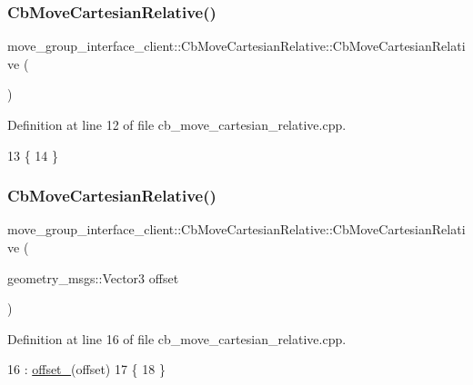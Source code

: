 \subsubsection{\texorpdfstring{Cb\+Move\+Cartesian\+Relative()}{CbMoveCartesianRelative()}\hspace{0.1cm}{\footnotesize\ttfamily [1/2]}}
{\footnotesize\ttfamily move\+\_\+group\+\_\+interface\+\_\+client\+::\+Cb\+Move\+Cartesian\+Relative\+::\+Cb\+Move\+Cartesian\+Relative (\begin{DoxyParamCaption}{ }\end{DoxyParamCaption})}



Definition at line 12 of file cb\+\_\+move\+\_\+cartesian\+\_\+relative.\+cpp.


\begin{DoxyCode}
13 \{
14 \}
\end{DoxyCode}
\mbox{\label{classmove__group__interface__client_1_1CbMoveCartesianRelative_afae824d1c68eaae5923166606ddb09f6}} 
\subsubsection{\texorpdfstring{Cb\+Move\+Cartesian\+Relative()}{CbMoveCartesianRelative()}\hspace{0.1cm}{\footnotesize\ttfamily [2/2]}}
{\footnotesize\ttfamily move\+\_\+group\+\_\+interface\+\_\+client\+::\+Cb\+Move\+Cartesian\+Relative\+::\+Cb\+Move\+Cartesian\+Relative (\begin{DoxyParamCaption}\item[{geometry\+\_\+msgs\+::\+Vector3}]{offset }\end{DoxyParamCaption})}



Definition at line 16 of file cb\+\_\+move\+\_\+cartesian\+\_\+relative.\+cpp.


\begin{DoxyCode}
16                                                                             : 
      \hyperlink{classmove__group__interface__client_1_1CbMoveCartesianRelative_affe67c635e1cd77013609a784ac53b92}{offset\_}(offset)
17 \{
18 \}
\end{DoxyCode}


